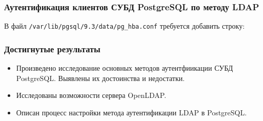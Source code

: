 \documentclass[xcolor={dvipsnames,table}]{beamer}
\begin{document}
\begin{frame}
 \frametitle{Аутентификация клиентов СУБД PostgreSQL по методу LDAP}
  


В файл \texttt{/var/lib/pgsql/9.3/data/pg\_hba.conf} требуется добавить строку:

\vspace{ 1em }



\hgdlnpfppbplcjckcinkgamfnelbbbdg



  
\end{frame}
\begin{frame}
 \frametitle{Достигнутые результаты}
  

\begin{itemize}
  \item Произведено исследование основных методов аутентфиикации СУБД PostgreSQL. Выявлены их достоинства и недостатки.
  \item Исследованы возможности сервера OpenLDAP.
  \item Описан процесс настройки метода аутентификации LDAP в PostgreSQL.
\end{itemize}

  
\end{frame}
\end{document}
